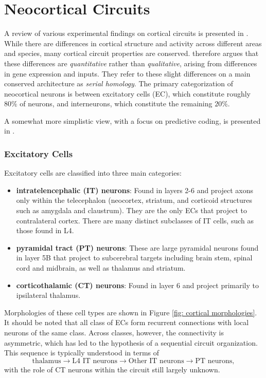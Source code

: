 \section{Neocortical Circuits}

A review of various experimental findings on cortical circuits is presented in \cite{harris2015neocortical}. While there are differences in cortical structure and activity across different areas and species, many cortical circuit properties are conserved. \cite{harris2015neocortical} therefore argues that these differences are \textit{quantitative} rather than \textit{qualitative}, arising from differences in gene expression and inputs. They refer to these slight differences on a main conserved architecture as \textit{serial homology}. The primary categorization of neocortical neurons is between excitatory cells (EC), which constitute roughly $80\%$ of neurons, and interneurons, which constitute the remaining $20\%$.  

A somewhat more simplistic view, with a focus on predictive coding, is presented in \cite{bastos2012canonical}.

\subsubsection{Excitatory Cells}

Excitatory cells are classified into three main categories:
\begin{itemize}
	\item \textbf{intratelencephalic (IT) neurons}: Found in layers 2-6 and project axons only within the telecephalon (neocortex, striatum, and corticoid structures such as amygdala and claustrum). They are the only ECs that project to contralateral cortex. There are many distinct subclasses of IT cells, such as those found in L4.
	\item \textbf{pyramidal tract (PT) neurons}: These are large pyramidal neurons found in layer 5B that project to subcerebral targets including brain stem, spinal cord and midbrain, as well as thalamus and striatum. 
	\item \textbf{corticothalamic (CT) neurons}: Found in layer 6 and project primarily to ipsilateral thalamus.
\end{itemize}
Morphologies of these cell types are shown in Figure \ref{fig: cortical morphologies}. It should be noted that all class of ECs form recurrent connections with local neurons of the same class. Across classes, however, the connectivity is asymmetric, which has led to the hypothesis of a sequential circuit organization. This sequence is typically understood in terms of
$$ \text{thalamus} \rightarrow \text{L4 IT neurons} \rightarrow \text{Other IT neurons} \rightarrow \text{PT neurons},$$
with the role of CT neurons within the circuit still largely unknown. 

